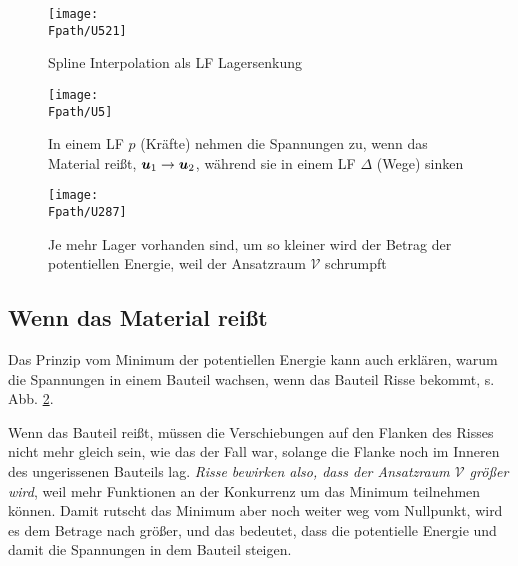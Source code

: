 {{{{{%
\begin{figure}[tbp]
\centering
\if {} \sidecaption \fi
\texttt{[image: \\Fpath/U521]}
\caption{Spline Interpolation als LF Lagersenkung }
\label{U521}
\end{figure}%

\begin{figure}[tbp]
\centering
\if {} \sidecaption \fi
\texttt{[image: \\Fpath/U5]}
\caption{In einem LF $p$ (Kr\"{a}fte) nehmen die Spannungen zu, wenn das Material rei{\ss}t, $\mbox{\boldmath $u$}_1 \to \mbox{\boldmath $u$}_2$, w\"{a}hrend sie in einem LF $\Delta$ (Wege) sinken}
\label{U5}
\end{figure}%
\begin{figure}[tbp]
\centering
\if {} \sidecaption \fi
\texttt{[image: \\Fpath/U287]}
\caption{Je mehr Lager vorhanden sind, um so kleiner wird der Betrag der potentiellen Energie, weil der Ansatzraum $\mathcal{V}$ schrumpft}
\label{U287}
\end{figure}%

{\textcolor{sectionTitleBlue}{\subsection{Wenn das Material rei{\ss}t}}}
Das Prinzip vom Minimum der potentiellen Energie kann auch erkl\"{a}ren, warum die Spannungen in einem Bauteil wachsen, wenn das Bauteil Risse bekommt, s. Abb. \ref{U5}.

Wenn das Bauteil rei{\ss}t, m\"{u}ssen die Verschiebungen auf den Flanken des Risses nicht mehr gleich sein, wie das der Fall war, solange die Flanke noch im Inneren des ungerissenen Bauteils lag. {\em Risse bewirken also, dass der Ansatzraum $\mathcal{V}$ gr\"{o}{\ss}er wird\/}, weil mehr Funktionen an der Konkurrenz um das Minimum teilnehmen k\"{o}nnen. Damit rutscht das Minimum aber noch weiter weg vom Nullpunkt, wird es dem Betrage nach gr\"{o}{\ss}er, und das bedeutet, dass die potentielle Energie und damit die Spannungen in dem Bauteil steigen.

}}}}}
